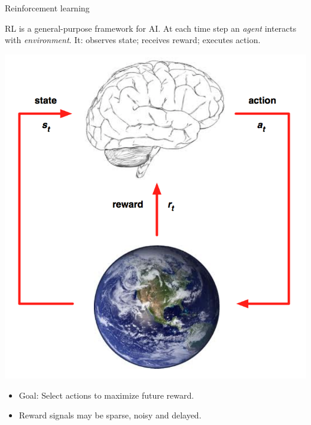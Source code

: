 \documentclass[11pt,compress,t,notes=noshow, xcolor=table]{beamer}
\begin{document}
\begin{vbframe}{Reinforcement learning}

RL is a general-purpose framework for AI.
At each time step an \emph{agent} interacts with \emph{environment}. 
It: observes state; receives reward; executes action.

\begin{center}
  \includegraphics[height=0.4\textheight,keepaspectratio]{figure_man/state_action_reward_diagram.png}
\end{center}


\begin{itemize}
\item Goal: Select actions to maximize future reward.
\item Reward signals may be sparse, noisy and delayed.
\end{itemize}

\end{vbframe}
\end{document}
